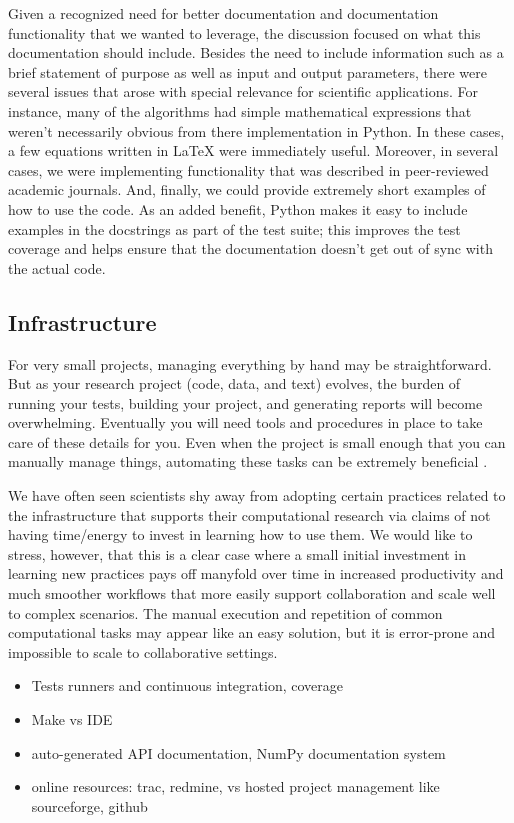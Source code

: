 \documentclass[ChapterTOCs,krantz2]{krantz} %
\theoremstyle{definition}
\begin{document}
Given a recognized need for better documentation and documentation
functionality that we wanted to leverage, the discussion focused on what this
documentation should include. Besides the need to include information such as a
brief statement of purpose as well as input and output parameters, there were
several issues that arose with special relevance for scientific applications.
For instance, many of the algorithms had simple mathematical expressions that
weren't necessarily obvious from there implementation in Python. In these
cases, a few equations written in \LaTeX{} were immediately useful. Moreover,
in several cases, we were implementing functionality that was described in
peer-reviewed academic journals. And, finally, we could provide extremely
short examples of how to use the code. As an added benefit, Python makes it
easy to include examples in the docstrings as part of the test suite; this
improves the test coverage and helps ensure that the documentation doesn't get
out of sync with the actual code.

\subsection{Infrastructure}

For very small projects, managing everything by hand may be straightforward.
But as your research project (code, data, and text) evolves, the burden of
running your tests, building your project, and generating reports will become
overwhelming. Eventually you will need tools and procedures in place to take
care of these details for you. Even when the project is small enough that you
can manually manage things, automating these tasks can be extremely beneficial
\cite{doar2005practical}.

We have often seen scientists shy away from adopting certain practices related
to the infrastructure that supports their computational research via claims of
not having time/energy to invest in learning how to use them.  We would like to
stress, however, that this is a clear case where a small initial investment in
learning new practices pays off manyfold over time in increased productivity
and much smoother workflows that more easily support collaboration and scale
well to complex scenarios.  The manual execution and repetition of common
computational tasks may appear like an easy solution, but it is error-prone and
impossible to scale to collaborative settings.

\begin{itemize}

\item Tests runners and continuous integration, coverage

\item Make vs IDE

\item auto-generated API documentation, NumPy documentation system \cite{SciPyProceedings_27}

\item online resources: trac, redmine, vs hosted project management like
      sourceforge, github

\end{itemize}
\end{document}
